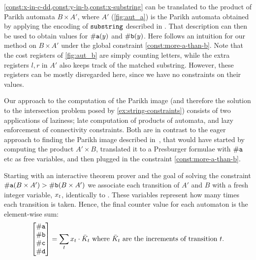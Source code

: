 \cref{const:x-in-c-dd,const:y-in-b,const:x-substring} can be translated to the
product of Parikh automata $B \times A'$, where $A'$ (\cref{fig:aut_a}) is the
Parikh automata obtained by applying the encoding of $\operatorname{\mathtt{substring}}$ described in
\cite{ostrich-plus}. That description can then be used to obtain values for
$\#\text{\texttt{a}}(y)$ and $\#\text{\texttt{b}}(y)$. Here follows an intuition
for our method on $B \times A'$ under the global constraint
\cref{const:more-a-than-b}. Note that the cost registers of \cref{fig:aut_b} are
simply counting letters, while the extra registers $l, r$ in $A'$ also keeps
track of the matched substring. However, these registers can be mostly
disregarded here, since we have no constraints on their values.

Our approach to the computation of the Parikh image (and therefore the solution
to the intersection problem posed by \cref{ex:string-constraints}) consists of
two applications of laziness; late computation of products of automata, and lazy
enforcement of connectivity constraints. Both are in contrast to the eager
approach to finding the Parikh image described in~\cite{generate-parikh-image},
that would have started by computing the product $A' \times B$, translated it to
a Presburger formulae with $\#\text{\texttt{a}}$ etc as free variables, and then
plugged in the constraint \cref{const:more-a-than-b}.

Starting with an interactive theorem prover and the goal of solving the
constraint $\#\text{\texttt{a}}(B \times A') > \#\text{\texttt{b}}(B \times A')$
we associate each transition of $A'$ and $B$ with a fresh integer variable,
$x_t$, identically to \cite{generate-parikh-image}. These
variables represent how many times each transition is taken. Hence, the final
counter value for each automaton is the element-wise sum:
\begin{equation}
\begin{bmatrix} \#\text{\texttt{a}} \\ \#\text{\texttt{b}} \\ \#\text{\texttt{c}} \\ \#\text{\texttt{d}} \end{bmatrix} = \sum_t x_t \cdot \bar{K}_t \text{ where $\bar{K}_t$ are the increments of transition $t$}.
\end{equation}

